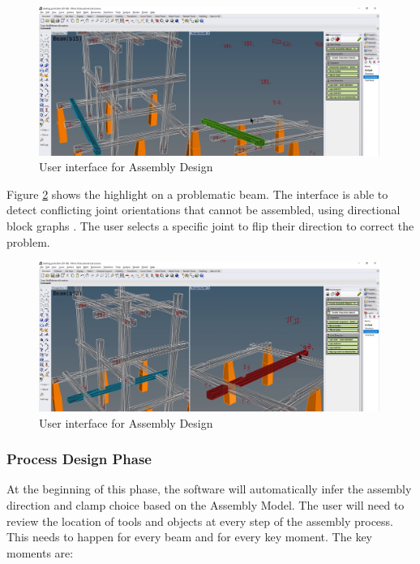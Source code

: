 \begin{figure}[!h]
    \centering
    \includegraphics[width=0.99\textwidth]{images/05/image9.png}
    \caption{User interface for Assembly Design}
    \label{fig:user-interface-for-assembly-design}
\end{figure}

Figure \ref{fig:user-interface-problematic-beam} shows the highlight on a problematic beam. The interface is able to detect conflicting joint orientations that cannot be assembled, using directional block graphs \parencite{wilsonGeometricAssemblyPlanning1992b}. The user selects a specific joint to flip their direction to correct the problem.

\begin{figure}[!h]
    \centering
    \includegraphics[width=0.99\textwidth]{images/05/image3.png}
    \caption{User interface for Assembly Design}
    \label{fig:user-interface-problematic-beam}
\end{figure}

\FloatBarrier

\subsubsection{Process Design Phase}
\label{subsubsection:exploration-2-process-design-phase}

At the beginning of this phase, the software will automatically infer the assembly direction and clamp choice based on the Assembly Model. 
The user will need to review the location of tools and objects at every step of the assembly process. This needs to happen for every beam and for every key moment. The key moments are:


